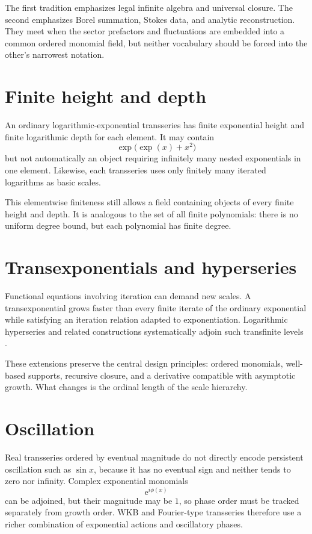 \documentclass[11pt,oneside]{book}
\theoremstyle{definition}
\theoremstyle{remark}
\newcommand{\e}{\mathrm{e}}
\begin{document}
The first tradition emphasizes legal infinite algebra and universal closure. The
second emphasizes Borel summation, Stokes data, and analytic reconstruction.
They meet when the sector prefactors and fluctuations are embedded into a common
ordered monomial field, but neither vocabulary should be forced into the other's
narrowest notation.

\section{Finite height and depth}

An ordinary logarithmic-exponential transseries has finite exponential height
and finite logarithmic depth for each element. It may contain
\[
  \exp\!\bigl(\exp(x)+x^2\bigr)
\]
but not automatically an object requiring infinitely many nested exponentials
in one element. Likewise, each transseries uses only finitely many iterated
logarithms as basic scales.

This elementwise finiteness still allows a field containing objects of every
finite height and depth. It is analogous to the set of all finite polynomials:
there is no uniform degree bound, but each polynomial has finite degree.

\section{Transexponentials and hyperseries}

Functional equations involving iteration can demand new scales. A
transexponential grows faster than every finite iterate of the ordinary
exponential while satisfying an iteration relation adapted to exponentiation.
Logarithmic hyperseries and related constructions systematically adjoin such
transfinite levels
\cite{SchmelingThesis,vanDenDriesHoevenKaplan,PadgettTransexponential}.

These extensions preserve the central design principles:
ordered monomials, well-based supports, recursive closure, and a derivative
compatible with asymptotic growth. What changes is the ordinal length of the
scale hierarchy.

\section{Oscillation}

Real transseries ordered by eventual magnitude do not directly encode persistent
oscillation such as $\sin x$, because it has no eventual sign and neither tends
to zero nor infinity. Complex exponential monomials
\[
  \e^{i\phi(x)}
\]
can be adjoined, but their magnitude may be $1$, so phase order must be tracked
separately from growth order. WKB and Fourier-type transseries therefore use a
richer combination of exponential actions and oscillatory phases.
\end{document}
